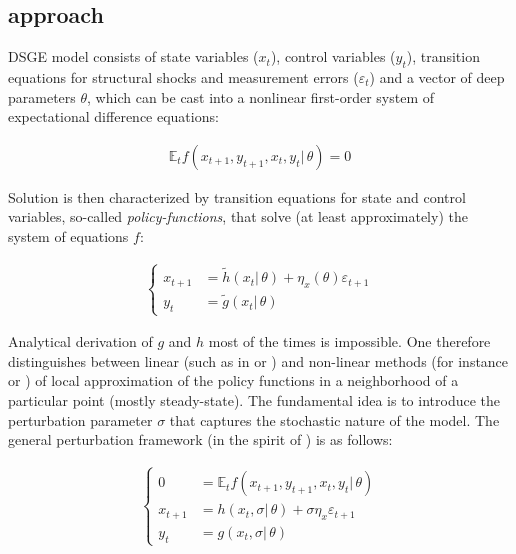 \documentclass{pracamgr}
\numberwithin{equation}{section}
\begin{document}
\subsection{\citet{klein2000using} approach}

DSGE model consists of state variables ($x_{t}$), control variables ($y_{t}$), transition equations for structural shocks and measurement errors ($\varepsilon_{t}$) and a vector of deep parameters $\theta$, which can be cast into a nonlinear first-order system of expectational difference equations:

\begin{align}
\mathbb{E}_{t}f\left(x_{t+1},y_{t+1},x_{t},y_{t} | \, \theta \right) = 0
\end{align}

Solution is then characterized by transition equations for state and control variables, so-called \textit{policy-functions}, that solve (at least approximately) the system of equations $f$:

\begin{align}
\left\{
\begin{array}{cl}
x_{t+1} &= \widetilde{h} \left( x_{t} | \, \theta \right) + \eta_{x} \left( \theta \right) \varepsilon_{t+1} \\
y_{t} &= \widetilde{g} \left( x_{t} | \, \theta \right)
\end{array}
\right.
\end{align}

Analytical derivation of $g$ and $h$ most of the times is impossible. One therefore distinguishes between linear (such as in \citet{klein2000using} or \citet{sims2002solving}) and non-linear methods (for instance \citet{schmitt2004solving} or \citet{gomme2011second}) of local approximation of the policy functions in a neighborhood of a particular point (mostly steady-state). The fundamental idea is to introduce the perturbation parameter $\sigma$ that captures the stochastic nature of the model. The general perturbation framework (in the spirit of \citet{schmitt2004solving}) is as follows:

\begin{align}
\left\{
\begin{array}{cl}
0 &= \mathbb{E}_{t}f\left(x_{t+1},y_{t+1},x_{t},y_{t} | \, \theta \right) \\
x_{t+1} &= h \left( x_{t}, \sigma | \, \theta \right) + \sigma \eta_{x} \varepsilon_{t+1} \\
y_{t} &= g \left( x_{t}, \sigma | \, \theta \right)
\end{array}
\right.
\end{align}
\end{document}
